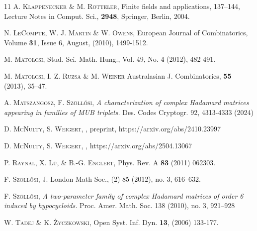 \documentclass[12pt]{amsart}
\numberwithin{equation}{section}
\theoremstyle{definition}
\theoremstyle{remark}
\theoremstyle{remark}
\begin{document}
\begin{thebibliography}{11}
\textsc{A. Klappenecker \& M. R\"otteler},
Finite fields and applications,  137--144, Lecture Notes in
Comput. Sci., {\bf 2948}, Springer, Berlin, 2004.

\textsc{N. LeCompte, W. J. Martin \& W. Owens},
European Journal of Combinatorics, Volume {\bf 31}, Issue 6, August, (2010), 1499-1512.

\textsc{M. Matolcsi},
Stud. Sci. Math. Hung., Vol. 49, No. 4 (2012),  482-491.

\textsc{M. Matolcsi, I. Z. Ruzsa \& M. Weiner}
 Australasian J. Combinatorics, {\bf 55} (2013), 35--47.

\textsc{A. Matszangosz, F. Sz\"oll\H osi},
{\em A characterization of complex Hadamard matrices appearing in families of MUB triplets.}
Des. Codes Cryptogr. 92, 4313-4333 (2024)

\textsc{D. McNulty, S. Weigert},
, preprint, 
https://arxiv.org/abs/2410.23997

\textsc{D. McNulty, S. Weigert},
,
https://arxiv.org/abs/2504.13067


\textsc{P. Raynal, X. L\"u, \& B.-G. Englert},
Phys. Rev. A {\bf 83} (2011) 062303.

\textsc{F. Sz\"oll\H osi},
J. London Math Soc., (2) 85 (2012), no. 3, 616--632.


\textsc{F. Sz\"oll\H osi}, {\em A two-parameter family of complex Hadamard matrices of order 6 induced by hypocycloids.} Proc. Amer. Math. Soc. 138 (2010), no. 3, 921--928

\textsc{W. Tadej \& K. \.Zyczkowski},
Open Syst. Inf. Dyn. {\bf 13}, (2006) 133-177.



\end{thebibliography}
\end{document}

